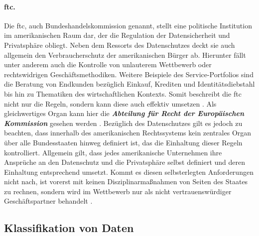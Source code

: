 
\paragraph{\acl{ftc}.}
\label{sec:Grundlagen:para:Federal Trade Commission}
Die \acl{ftc}, auch Bundeshandelskommission genannt, stellt eine politische Institution im amerikanischen Raum dar, der die Regulation der Datensicherheit und Privatsphäre obliegt. Neben dem Ressorts des Datenschutzes deckt sie auch allgemein den Verbraucherschutz der amerikanischen Bürger ab. Hierunter fällt unter anderem auch die Kontrolle von unlauterem Wettbewerb oder rechtswidrigen Geschäftsmethodiken. Weitere Beispiele des Service-Portfolios sind die Beratung von Endkunden bezüglich Einkauf, Krediten und Identitätsdiebstahl bis hin zu Thematiken des wirtschaftlichen Kontexts. Somit beschreibt die \ac{ftc} nicht nur die Regeln, sondern kann diese auch effektiv umsetzen \cite{FTC}. Als gleichwertiges Organ kann hier die \textbf{\textit{Abteilung für Recht der Europäischen Kommission}} gesehen werden \cite{FTCEU}. Bezüglich des Datenschutzes gilt es jedoch zu beachten, dass innerhalb des amerikanischen Rechtssystems kein zentrales Organ über alle Bundesstaaten hinweg definiert ist, das die Einhaltung dieser Regeln kontrolliert. Allgemein gilt, dass jedes amerikanische Unternehmen ihre Ansprüche an den Datenschutz und die Privatsphäre selbst definiert und deren Einhaltung entsprechend umsetzt. Kommt es diesen selbsterlegten Anforderungen nicht nach, ist vorerst mit keinen Disziplinarmaßnahmen von Seiten des Staates zu rechnen, sondern wird im Wettbewerb nur als nicht vertrauenswürdiger Geschäftspartner behandelt \cite{DatenschutzOrg2022}.

\subsection{Klassifikation von Daten}
\label{sec:Grundlagen:ssec:Klassifikation von Daten}

